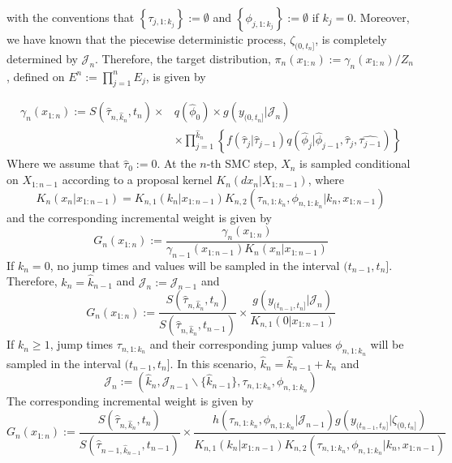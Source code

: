 \documentclass[12pt,a4paper]{article}
\begin{document}
with the conventions that $\left\{\tau_{j,1:k_j}\right\} := \emptyset$ and $\left\{\phi_{j,1:k_j}\right\} := \emptyset$ if $k_j = 0$. Moreover, we have known that the piecewise deterministic process, $\zeta_{(0,t_n]}$, is completely determined by $\mathcal{J}_n$. Therefore, the target distribution, $\pi_n(x_{1:n}) := \gamma_n(x_{1:n})/Z_n$, defined on $E^n := \prod_{j=1}^n E_j$, is given by

\begin{equation}
    \label{def:VRPF_Target}
    \begin{split}
    \gamma_n(x_{1:n}) := S\left(\hat{\tau}_{n,\hat{k}_n},t_n\right)\times & q\left(\hat{\phi}_0\right) \times g(y_{(0,t_n]}|\mathcal{J}_n)\\
    &\times \prod_{j=1}^{\hat{k}_n} \left\{f\left(\hat{\tau}_j|\hat{\tau}_{j-1}\right)q\left(\hat{\phi}_{j}|\hat{\phi}_{j-1},\hat{\tau}_j,\hat{\tau_{j-1}}\right)\right\}
    \end{split}
\end{equation}
Where we assume that $\hat{\tau}_0 := 0$. At the $n$-th SMC step, $X_n$ is sampled conditional on $X_{1:n-1}$ according to a proposal kernel $K_n\left(dx_n|X_{1:n-1}\right)$, where 
\begin{equation}
    \label{VRPF_Proposal}
    K_n\left(x_n|x_{1:n-1}\right) = K_{n,1}\left(k_n|x_{1:n-1}\right)K_{n,2}\left(\tau_{n,1:k_n},\phi_{n,1:k_n}|k_n,x_{1:n-1}\right)
\end{equation}
and the corresponding incremental weight is given by 
$$G_{n}\left(x_{1:n}\right) := \frac{\gamma_{n}\left(x_{1:n}\right)}{\gamma_{n-1}\left(x_{1:n-1}\right)K_{n}(x_n|x_{1:n-1})}$$
If $k_n = 0$, no jump times and values will be sampled in the interval $(t_{n-1},t_n]$. Therefore, $\hat{k}_n = \hat{k}_{n-1}$ and $\mathcal{J}_n := \mathcal{J}_{n-1}$ and 
\begin{equation}
\label{VRPFIncrement:0-jumps}
    G_n(x_{1:n}) := \frac{S\left(\hat{\tau}_{n,\hat{k}_n},t_n\right)}{S\left(\hat{\tau}_{n,\hat{k}_n},t_{n-1}\right)} \times \frac{g\left(y_{(t_{n-1},t_n]}|\mathcal{J}_n\right)}{K_{n,1}(0|x_{1:n-1})}
\end{equation}
If $k_n \geq 1$, jump times $\tau_{n,1:k_n}$ and their corresponding jump values $\phi_{n,1:k_n}$ will be sampled in the interval $(t_{n-1},t_n]$. In this scenario, $\hat{k}_n = \hat{k}_{n-1}+k_n$ and $$\mathcal{J}_n := \left(\hat{k}_n,\mathcal{J}_{n-1}\backslash\{\hat{k}_{n-1}\},\tau_{n,1:k_n},\phi_{n,1:k_n}\right)$$
The corresponding incremental weight is given by 
\begin{equation}
    \label{VRPFIncrement:n-jumps}
    G_n\left(x_{1:n}\right) := \frac{S\left(\hat{\tau}_{n,\hat{k}_n},t_n\right)}{S\left(\hat{\tau}_{n-1,\hat{k}_{n-1}},t_{n-1}\right)} \times \frac{h\left(\tau_{n,1:k_n},\phi_{n,1:k_n}|\mathcal{J}_{n-1}\right)g\left(y_{(t_{n-1},t_n]}|\zeta_{(0,t_n]}\right)}{K_{n,1}(k_n|x_{1:n-1})K_{n,2}(\tau_{n,1:k_n},\phi_{n,1:k_n}|k_n,x_{1:n-1})}
\end{equation}
\end{document}
